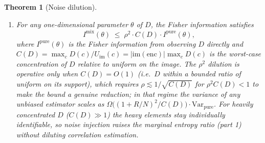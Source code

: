 \documentclass[conference]{IEEEtran}
\theoremstyle{definition}
\theoremstyle{plain}
\newtheorem{theorem}{Theorem}[section]
\theoremstyle{remark}
\newcommand{\enc}{\mathrm{enc}}
\begin{document}
\begin{theorem}[Noise dilution]
\begin{enumerate}
\item For any one-dimensional parameter $\theta$ of $D$, the
  Fisher information satisfies
  \begin{equation}
  \label{eq:fisher-noise}
  I^{\mathrm{mix}}(\theta) \;\leq\; \rho^2 \cdot C(D) \cdot I^{\mathrm{pure}}(\theta),
  \end{equation}
  where $I^{\mathrm{pure}}(\theta)$ is the Fisher information from
  observing $D$ directly and
  $C(D) = \max_c D(c) / U_{\mathrm{im}}(c) = |\mathrm{im}(\enc)| \max_c D(c)$
  is the worst-case concentration of $D$ relative to uniform on the
  image.  The $\rho^2$ dilution is operative only when $C(D) = O(1)$
  (i.e.\ $D$ within a bounded ratio of uniform on its support), which
  requires $\rho \lesssim 1/\sqrt{C(D)}$ for $\rho^2 C(D) < 1$ to make
  the bound a genuine reduction; in that regime the variance of any
  unbiased estimator scales as
  $\Omega\!\bigl((1 + R/N)^2 / C(D)\bigr) \cdot \mathrm{Var}_{\mathrm{pure}}$.
  For heavily concentrated $D$ ($C(D) \gg 1$) the heavy elements stay
  individually identifiable, so noise injection raises the marginal
  entropy ratio (part 1) without diluting correlation estimation.
\end{enumerate}
\end{theorem}
\end{document}
